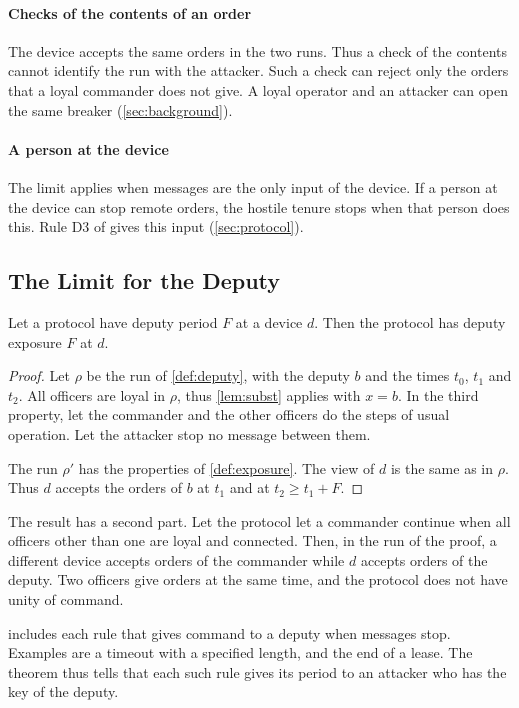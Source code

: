 \paragraph{Checks of the contents of an order}
The device accepts the same orders in the two runs. Thus a check of the contents cannot
identify the run with the attacker. Such a check can reject only the orders that a loyal
commander does not give. A loyal operator and an attacker can open the same breaker
(\cref{sec:background}).

\paragraph{A person at the device}
The limit applies when messages are the only input of the device. If a person at the
device can stop remote orders, the hostile tenure stops when that person does this. Rule
D3 of \sys{} gives this input (\cref{sec:protocol}).

\subsection{The Limit for the Deputy}

\begin{thm}
\label{thm:deputy}
Let a protocol have deputy period $F$ at a device $d$. Then the protocol has deputy
exposure $F$ at $d$.
\end{thm}

\begin{proof}
Let $\rho$ be the run of \cref{def:deputy}, with the deputy $b$ and the times $t_0$, $t_1$
and $t_2$. All officers are loyal in $\rho$, thus \cref{lem:subst} applies with $x = b$.
In the third property, let the commander
and the other officers do the steps of usual operation. Let the attacker stop no message
between them.

The run $\rho'$ has the properties of \cref{def:exposure}. The view
of $d$ is the same as in $\rho$. Thus $d$ accepts the orders of $b$ at $t_1$ and at
$t_2 \ge t_1 + F$.
\end{proof}

The result has a second part. Let the protocol let a commander continue when all officers
other than one are loyal and connected. Then, in the run of the proof, a different device
accepts orders of the commander while $d$ accepts orders of the deputy. Two officers give
orders at the same time, and the protocol does not have unity of command.

 includes each rule that gives command to a deputy when messages stop.
Examples are a timeout with a specified length, and the end of a lease. The theorem thus
tells that each such rule gives its period to an attacker who has the key of the deputy.

